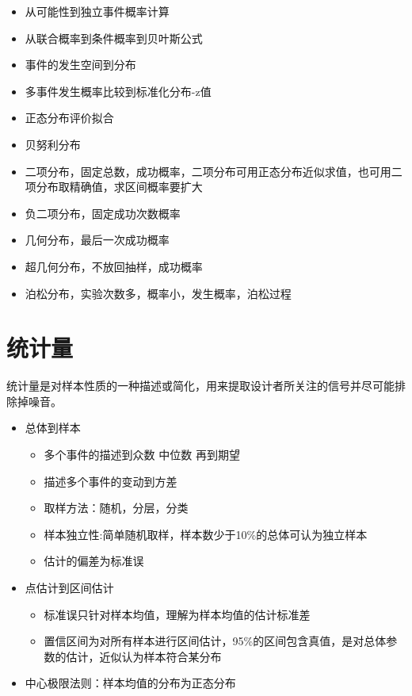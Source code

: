 \documentclass[]{book}
\providecommand{\tightlist}{%
  \setlength{\itemsep}{0pt}\setlength{\parskip}{0pt}}
\begin{document}
\begin{itemize}
\tightlist
\item
  从可能性到独立事件概率计算
\item
  从联合概率到条件概率到贝叶斯公式
\item
  事件的发生空间到分布
\item
  多事件发生概率比较到标准化分布-z值
\item
  正态分布评价拟合
\item
  贝努利分布
\item
  二项分布，固定总数，成功概率，二项分布可用正态分布近似求值，也可用二项分布取精确值，求区间概率要扩大
\item
  负二项分布，固定成功次数概率
\item
  几何分布，最后一次成功概率
\item
  超几何分布，不放回抽样，成功概率
\item
  泊松分布，实验次数多，概率小，发生概率，泊松过程
\end{itemize}

\hypertarget{ux7edfux8ba1ux91cf}{%
\section{统计量}\label{ux7edfux8ba1ux91cf}}

统计量是对样本性质的一种描述或简化，用来提取设计者所关注的信号并尽可能排除掉噪音。

\begin{itemize}
\item
  总体到样本

  \begin{itemize}
  \tightlist
  \item
    多个事件的描述到众数 中位数 再到期望
  \item
    描述多个事件的变动到方差
  \item
    取样方法：随机，分层，分类
  \item
    样本独立性:简单随机取样，样本数少于10\%的总体可认为独立样本
  \item
    估计的偏差为标准误
  \end{itemize}
\item
  点估计到区间估计

  \begin{itemize}
  \tightlist
  \item
    标准误只针对样本均值，理解为样本均值的估计标准差
  \item
    置信区间为对所有样本进行区间估计，95\%的区间包含真值，是对总体参数的估计，近似认为样本符合某分布
  \end{itemize}
\item
  中心极限法则：样本均值的分布为正态分布
\end{itemize}
\end{document}
